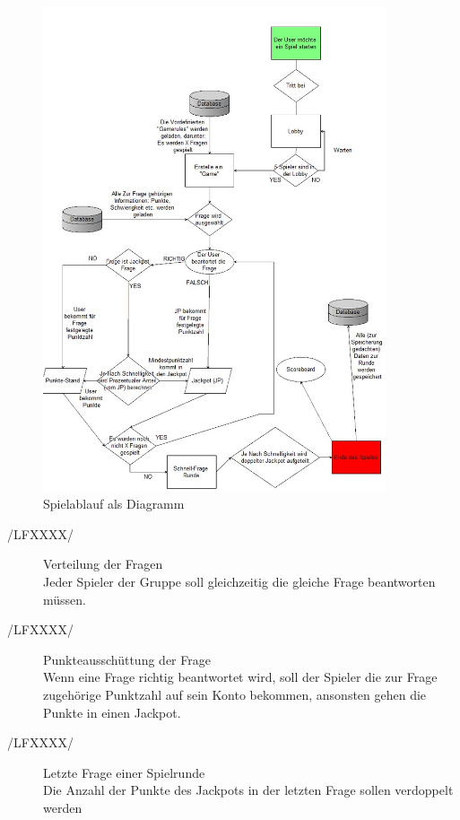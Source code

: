\documentclass[11pt,a4paper]{scrreprt}
\begin{document}
\begin{figure}
	\centering
	\includegraphics[width=0.9\textwidth, height=0.9\textheight]{Diagramm_002.jpg}
	\caption{Spielablauf als Diagramm}
	\label{img:Spielablauf}
\end{figure}
\begin{description}
\item[/LFXXXX/]Verteilung der Fragen \\
Jeder Spieler der Gruppe soll gleichzeitig die gleiche Frage beantworten müssen.
 
\item[/LFXXXX/]Punkteausschüttung der Frage \\
Wenn eine Frage richtig beantwortet wird, soll der Spieler die zur Frage zugehörige Punktzahl auf sein Konto bekommen, ansonsten gehen die Punkte in einen Jackpot.

\item[/LFXXXX/] Letzte Frage einer Spielrunde \\
Die Anzahl der Punkte des Jackpots in der letzten Frage sollen verdoppelt werden
\end{description}
\end{document}

